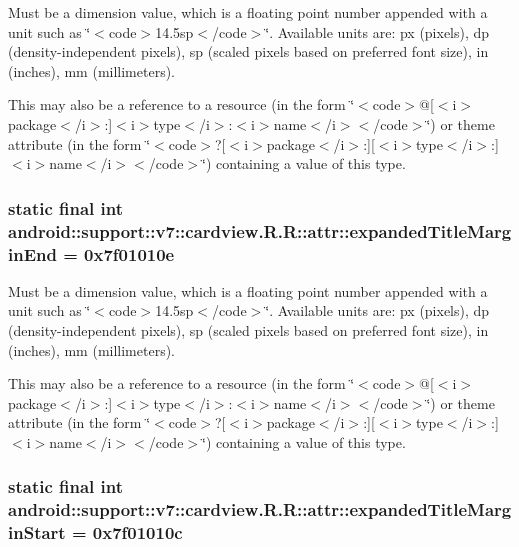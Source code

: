 Must be a dimension value, which is a floating point number appended with a unit such as \char`\"{}$<$code$>$14.5sp$<$/code$>$\char`\"{}. Available units are: px (pixels), dp (density-independent pixels), sp (scaled pixels based on preferred font size), in (inches), mm (millimeters). 

This may also be a reference to a resource (in the form \char`\"{}$<$code$>$@\mbox{[}$<$i$>$package$<$/i$>$:\mbox{]}$<$i$>$type$<$/i$>$:$<$i$>$name$<$/i$>$$<$/code$>$\char`\"{}) or theme attribute (in the form \char`\"{}$<$code$>$?\mbox{[}$<$i$>$package$<$/i$>$:\mbox{]}\mbox{[}$<$i$>$type$<$/i$>$:\mbox{]}$<$i$>$name$<$/i$>$$<$/code$>$\char`\"{}) containing a value of this type. \hypertarget{classandroid_1_1support_1_1v7_1_1cardview_1_1_r_1_1attr_8df870ae7c3b1394a7477b7be747f716}{
\subsubsection[{expandedTitleMarginEnd}]{\setlength{\rightskip}{0pt plus 5cm}static final int android::support::v7::cardview.R.R::attr::expandedTitleMarginEnd = 0x7f01010e}}
\label{classandroid_1_1support_1_1v7_1_1cardview_1_1_r_1_1attr_8df870ae7c3b1394a7477b7be747f716}


Must be a dimension value, which is a floating point number appended with a unit such as \char`\"{}$<$code$>$14.5sp$<$/code$>$\char`\"{}. Available units are: px (pixels), dp (density-independent pixels), sp (scaled pixels based on preferred font size), in (inches), mm (millimeters). 

This may also be a reference to a resource (in the form \char`\"{}$<$code$>$@\mbox{[}$<$i$>$package$<$/i$>$:\mbox{]}$<$i$>$type$<$/i$>$:$<$i$>$name$<$/i$>$$<$/code$>$\char`\"{}) or theme attribute (in the form \char`\"{}$<$code$>$?\mbox{[}$<$i$>$package$<$/i$>$:\mbox{]}\mbox{[}$<$i$>$type$<$/i$>$:\mbox{]}$<$i$>$name$<$/i$>$$<$/code$>$\char`\"{}) containing a value of this type. \hypertarget{classandroid_1_1support_1_1v7_1_1cardview_1_1_r_1_1attr_ba5b35a84ba6f378b40e2e21ccd2179a}{
\subsubsection[{expandedTitleMarginStart}]{\setlength{\rightskip}{0pt plus 5cm}static final int android::support::v7::cardview.R.R::attr::expandedTitleMarginStart = 0x7f01010c}}
\label{classandroid_1_1support_1_1v7_1_1cardview_1_1_r_1_1attr_ba5b35a84ba6f378b40e2e21ccd2179a}


